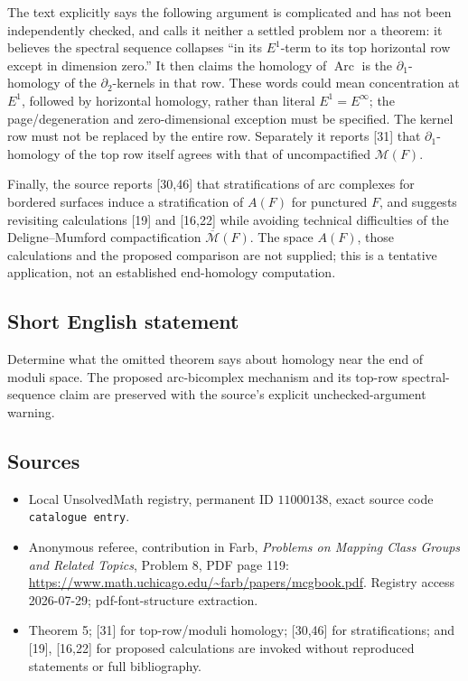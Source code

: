 \documentclass[11pt]{article}
\begin{document}
The text explicitly says the following argument is complicated and has not been independently checked, and calls it neither a settled problem nor a theorem: it believes the spectral sequence collapses ``in its \(E^1\)-term to its top horizontal row except in dimension zero.'' It then claims the homology of \(\operatorname{Arc}\) is the \(\partial_1\)-homology of the \(\partial_2\)-kernels in that row. These words could mean concentration at \(E^1\), followed by horizontal homology, rather than literal \(E^1=E^\infty\); the page/degeneration and zero-dimensional exception must be specified. The kernel row must not be replaced by the entire row. Separately it reports [31] that \(\partial_1\)-homology of the top row itself agrees with that of uncompactified \(\mathcal M(F)\).

Finally, the source reports [30,46] that stratifications of arc complexes for bordered surfaces induce a stratification of \(A(F)\) for punctured \(F\), and suggests revisiting calculations [19] and [16,22] while avoiding technical difficulties of the Deligne--Mumford compactification \(\overline{\mathcal M}(F)\). The space \(A(F)\), those calculations and the proposed comparison are not supplied; this is a tentative application, not an established end-homology computation.
\subsection{Short English statement}
Determine what the omitted theorem says about homology near the end of moduli space. The proposed arc-bicomplex mechanism and its top-row spectral-sequence claim are preserved with the source's explicit unchecked-argument warning.
\subsection{Sources}
\begin{itemize}
\item Local UnsolvedMath registry, permanent ID \(11000138\), exact source code \texttt{catalogue entry}.
\item Anonymous referee, contribution in Farb, \emph{Problems on Mapping Class Groups and Related Topics}, Problem 8, PDF page 119: \url{https://www.math.uchicago.edu/~farb/papers/mcgbook.pdf}. Registry access 2026-07-29; pdf-font-structure extraction.
\item Theorem 5; [31] for top-row/moduli homology; [30,46] for stratifications; and [19], [16,22] for proposed calculations are invoked without reproduced statements or full bibliography.
\end{itemize}
\end{document}
